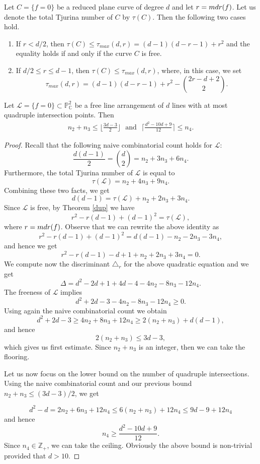\documentclass[10pt,a4paper]{amsart}
\begin{document}
\begin{theorem}
\label{dup}
Let $C = \{f=0\}$ be a reduced plane curve of degree $d$ and let $r = {\rm mdr}(f)$. Let us denote the total Tjurina number of $C$ by $\tau(C)$.
Then the following two cases hold.
\begin{enumerate}
\item[a)] If $r < d/2$, then $\tau(C) \leq \tau_{max}(d,r)= (d-1)(d-r-1)+r^2$ and the equality holds if and only if the curve $C$ is free.
\item[b)] If $d/2 \leq r \leq d-1$, then
$\tau(C) \leq \tau_{max}(d,r)$,
where, in this case, we set
$$\tau_{max}(d,r)=(d-1)(d-r-1)+r^2- \binom{2r-d+2}{2}.$$
\end{enumerate}
\end{theorem}

\begin{proposition}\label{EstimDLine}
Let $\mathcal{L} = \{f = 
0\}\subset\mathbb{P}^2_{\mathbb{C}}$ be a 
free line arrangement of $d$ 
lines with  at 
most quadruple intersection points. 
Then 
\begin{align}\label{EstimateD}
n_2+n_3\leq \bigg\lfloor\frac{3d-3}{2}\bigg\rfloor \:\:\:\text{and}\:\:\:  
\bigg\lceil\frac{d^2-10d+9}{12}\bigg\rceil\leq n_4.     
\end{align}
\end{proposition}

\begin{proof}
Recall that the following naive combinatorial count holds for $\mathcal{L}$:
$$\frac{d(d-1)}{2}=\binom{d}{2}=n_2+3n_3+6n_4.$$
Furthermore, the total Tjurina number of $\mathcal{L}$ is equal to
$$\tau(\mathcal{L}) = n_{2} + 4n_{3} + 9n_{4}.$$
Combining these two facts, we get
$$d(d-1)=\tau(\mathcal{L})+n_2+2n_3+3n_4.$$
Since $\mathcal{L}$ is free, by Theorem \ref{dup} we have
$$r^2-r(d-1)+(d-1)^2=\tau(\mathcal{L}),$$
where $r={\rm mdr}(f)$.
Observe that we can rewrite the above identity as
$$r^2-r(d-1)+(d-1)^2=d(d-1)-n_2-2n_3-3n_4,$$
and hence we get
$$r^2-r(d-1)-d+1+n_2+2n_3+3n_4=0.$$
We compute now the discriminant $\triangle_{r}$ for the above quadratic equation and we get
$$\Delta=d^2-2d+1+4d-4-4n_2-8n_3-12n_4.$$
The freeness of $\mathcal{L}$ implies
$$d^2+2d-3-4n_2-8n_3-12n_4 \geq 0.$$
Using again the naive combinatorial count we obtain
$$d^2+2d-3 \geq 4n_2+8n_3+12n_4 \geq 2(n_2+n_3)+d(d-1),$$
and hence
$$2(n_2+n_3) \leq 3d-3,$$
which gives us first estimate. Since $n_{2}+n_{3}$ is an integer, then we can take the flooring. 

Let us now focus on the lower bound on the number of quadruple intersections. 
Using the naive combinatorial count and our previous bound $n_{2}+n_{3} \leq (3d-3)/2$, we get

$$d^2-d=2n_2+6n_3+12n_4 \leq 6(n_2+n_3)+12n_4 \leq 9d-9+12n_4$$
and hence
$$n_4 \geq \frac{d^2-10d+9}{12}.$$
Since $n_{4} \in \mathbb{Z}_{+}$, we can take the ceiling. Obviously the above bound is non-trivial provided that $d>10$.
\end{proof}
\end{document}
